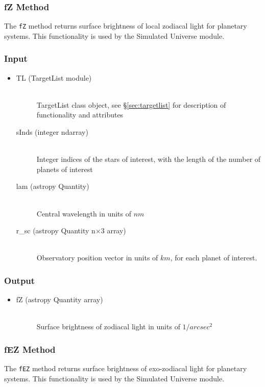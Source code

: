 \documentclass[cleanfoot]{asme2ej}
\begin{document}
\subsubsection{fZ Method} \label{sec:fZtask}
The \verb+fZ+ method returns surface brightness of local zodiacal light for planetary systems.  This functionality is used by the Simulated Universe module.

\subsubsection*{Input}
\begin{itemize}
\item 
\begin{description}
    \item[TL (TargetList module)] \hfill \\ TargetList class object, see \S\ref{sec:targetlist} for description of functionality and attributes       
    \item[sInds (integer ndarray)] \hfill \\ Integer indices of the stars of interest, with the length of the number of planets of interest
    \item[lam (astropy Quantity)] \hfill \\ Central wavelength in units of $ nm $
    \item[r\_sc (astropy Quantity n$\times$3 array)] \hfill \\ Observatory position vector in units of $ km $, for each planet of interest.
\end{description}
\end{itemize}

\subsubsection*{Output}
\begin{itemize}
\item 
\begin{description}
    \item[fZ (astropy Quantity array)] \hfill \\ Surface brightness of zodiacal light in units of $ 1/arcsec^2 $
\end{description}
\end{itemize}

\subsubsection{fEZ Method} \label{sec:fEZtask}
The \verb+fEZ+ method returns surface brightness of exo-zodiacal light for planetary systems.  This functionality is used by the Simulated Universe module.
\end{document}

